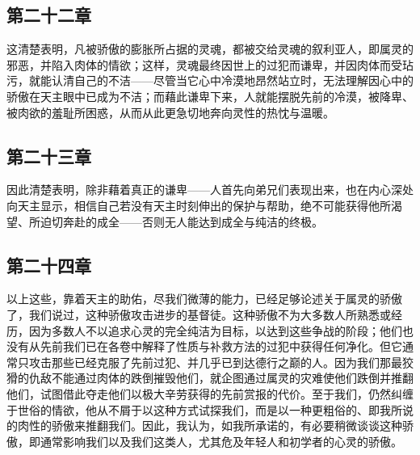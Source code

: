 \subsection{第二十二章}

\par

这清楚表明，凡被骄傲的膨胀所占据的灵魂，都被交给灵魂的叙利亚人，即属灵的邪恶，并陷入肉体的情欲；这样，灵魂最终因世上的过犯而谦卑，并因肉体而受玷污，就能认清自己的不洁——尽管当它心中冷漠地昂然站立时，无法理解因心中的骄傲在天主眼中已成为不洁；而藉此谦卑下来，人就能摆脱先前的冷漠，被降卑、被肉欲的羞耻所困惑，从而从此更急切地奔向灵性的热忱与温暖。\par


\subsection{第二十三章}

\par

因此清楚表明，除非藉着真正的谦卑——人首先向弟兄们表现出来，也在内心深处向天主显示，相信自己若没有天主时刻伸出的保护与帮助，绝不可能获得他所渴望、所迫切奔赴的成全——否则无人能达到成全与纯洁的终极。\par


\subsection{第二十四章}

\par

以上这些，靠着天主的助佑，尽我们微薄的能力，已经足够论述关于属灵的骄傲了，我们说过，这种骄傲攻击进步的基督徒。这种骄傲不为大多数人所熟悉或经历，因为多数人不以追求心灵的完全纯洁为目标，以达到这些争战的阶段；他们也没有从先前我们已在各卷中解释了性质与补救方法的过犯中获得任何净化。但它通常只攻击那些已经克服了先前过犯、并几乎已到达德行之巅的人。因为我们那最狡猾的仇敌不能通过肉体的跌倒摧毁他们，就企图通过属灵的灾难使他们跌倒并推翻他们，试图借此夺走他们以极大辛劳获得的先前赏报的代价。至于我们，仍然纠缠于世俗的情欲，他从不屑于以这种方式试探我们，而是以一种更粗俗的、即我所说的肉性的骄傲来推翻我们。因此，我认为，如我所承诺的，有必要稍微谈谈这种骄傲，即通常影响我们以及我们这类人，尤其危及年轻人和初学者的心灵的骄傲。\par

